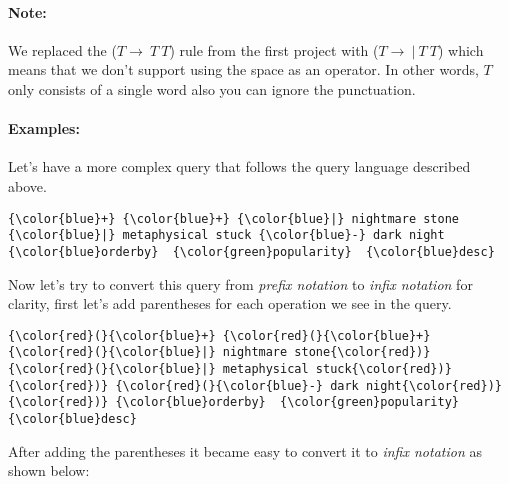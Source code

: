 \documentclass[11pt]{article}
\begin{document}
\paragraph{Note:} 
We replaced the ($T \to  \ T \ T$) rule from the first project with ($T \to \ |  \ T \ T$) which means that we don't support using the space as an operator. In other words, $T$ only consists of a single word also you can ignore the punctuation.

\paragraph{Examples: }

Let's have a more complex query that follows the query language described above. 

\begin{footnotesize}
\begin{Verbatim}[commandchars=\\\{\}]
{\color{blue}+} {\color{blue}+} {\color{blue}|} nightmare stone {\color{blue}|} metaphysical stuck {\color{blue}-} dark night {\color{blue}orderby}  {\color{green}popularity}  {\color{blue}desc}
\end{Verbatim}
\end{footnotesize} 
Now let's try to convert this query from \textit{prefix notation} to \textit{infix notation} for clarity, first let's add parentheses for each operation we see in the query.

 \begin{footnotesize}
\begin{Verbatim}[commandchars=\\\{\}]
{\color{red}(}{\color{blue}+} {\color{red}(}{\color{blue}+} {\color{red}(}{\color{blue}|} nightmare stone{\color{red})} {\color{red}(}{\color{blue}|} metaphysical stuck{\color{red})}{\color{red})} {\color{red}(}{\color{blue}-} dark night{\color{red})}{\color{red})} {\color{blue}orderby}  {\color{green}popularity}  {\color{blue}desc}
\end{Verbatim}
\end{footnotesize} 

After adding the parentheses it became easy to convert it to \textit{infix notation} as shown below:
\end{document}
